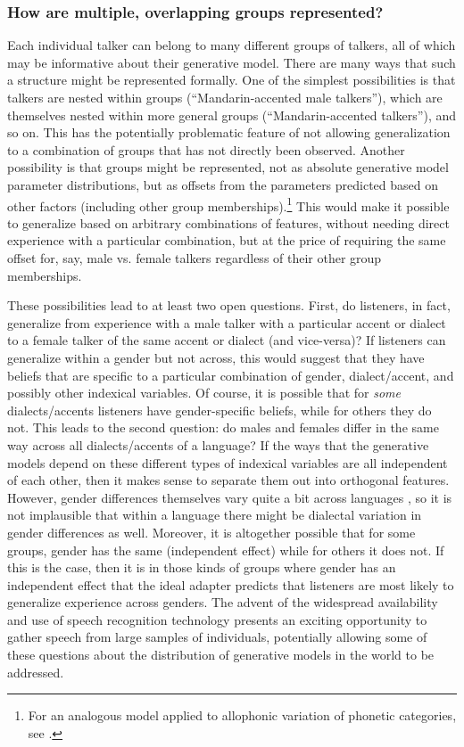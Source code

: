 \subsubsection{How are multiple, overlapping groups represented?}
\label{sec:what-repr-are}

\label{r1-features-classes}
Each individual talker can belong to many different groups of talkers, all of which may be informative about their generative model.  There are many ways that such a structure might be represented formally.  One of the simplest possibilities is that talkers are nested within groups (``Mandarin-accented male talkers''), which are themselves nested within more general groups (``Mandarin-accented talkers''), and so on.  This has the potentially problematic feature of not allowing generalization to a combination of groups that has not directly been observed.  Another possibility is that groups might be represented, not as absolute generative model parameter distributions, but as offsets from the parameters predicted based on other factors (including other group memberships).\footnote{For an analogous model applied to allophonic variation of phonetic categories, see \textcite{Dillon2013}.}  This would make it possible to generalize based on arbitrary combinations of features, without needing direct experience with a particular combination, but at the price of requiring the same offset for, say, male vs. female talkers regardless of their other group memberships.  

These possibilities lead to at least two open questions. First, do listeners, in fact, generalize from experience with a male talker with a particular accent or dialect to a female talker of the same accent or dialect (and vice-versa)?  If listeners can generalize within a gender but not across, this would suggest that they have beliefs that are specific to a particular combination of gender, dialect/accent, and possibly other indexical variables.  Of course, it is possible that for \emph{some} dialects/accents listeners have gender-specific beliefs, while for others they do not.  This leads to the second question: do males and females differ in the same way across all dialects/accents of a language?  If the ways that the generative models depend on these different types of indexical variables are all independent of each other, then it makes sense to separate them out into orthogonal features.  However, gender differences themselves vary quite a bit across languages \autocite{Johnson2006}, so it is not implausible that within a language there might be dialectal variation in gender differences as well.  Moreover, it is altogether possible that for some groups, gender has the same (independent effect) while for others it does not.  If this is the case, then it is in those kinds of groups where gender has an independent effect that the ideal adapter predicts that listeners are most likely to generalize experience across genders. The advent of the widespread availability and use of speech recognition technology presents an exciting opportunity to gather speech from large samples of individuals, potentially allowing some of these questions about the distribution of generative models in the world to be addressed.

